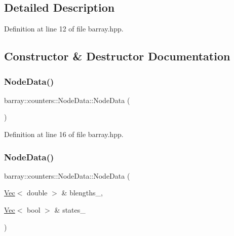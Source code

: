 \subsection{Detailed Description}


Definition at line 12 of file barray.\+hpp.



\subsection{Constructor \& Destructor Documentation}
\mbox{\label{classbarray_1_1counters_1_1_node_data_ac81efe4d55a03d7e2c01b85fd4a7bb03}} 
\subsubsection{\texorpdfstring{Node\+Data()}{NodeData()}\hspace{0.1cm}{\footnotesize\ttfamily [1/3]}}
{\footnotesize\ttfamily barray\+::counters\+::\+Node\+Data\+::\+Node\+Data (\begin{DoxyParamCaption}{ }\end{DoxyParamCaption})\hspace{0.3cm}{\ttfamily [inline]}}



Definition at line 16 of file barray.\+hpp.

\mbox{\label{classbarray_1_1counters_1_1_node_data_a34055795a0c4d33ed8546f59cb574c2c}} 
\subsubsection{\texorpdfstring{Node\+Data()}{NodeData()}\hspace{0.1cm}{\footnotesize\ttfamily [2/3]}}
{\footnotesize\ttfamily barray\+::counters\+::\+Node\+Data\+::\+Node\+Data (\begin{DoxyParamCaption}\item[{\hyperlink{namespacebarray_1_1counters_a7899949c19d9915ddc164b59004adbd2}{Vec}$<$ double $>$ \&}]{blengths\+\_\+,  }\item[{\hyperlink{namespacebarray_1_1counters_a7899949c19d9915ddc164b59004adbd2}{Vec}$<$ bool $>$ \&}]{states\+\_\+ }\end{DoxyParamCaption})\hspace{0.3cm}{\ttfamily [inline]}}



